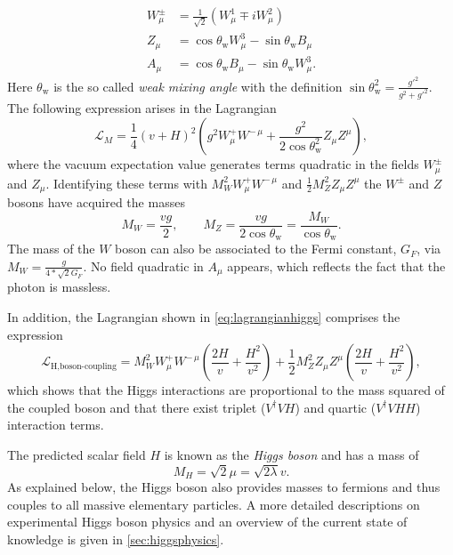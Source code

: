 \begin{align}
  W_\mu^\pm &= \frac{1}{\sqrt{2}} \left( W_\mu^1 \mp iW_\mu^2 \right) \\
  Z_\mu &= \cos\theta_\text{w} W_\mu^3 - \sin\theta_\text{w} B_\mu \\
  A_\mu &= \cos\theta_\text{w} B_\mu - \sin\theta_\text{w} W_\mu^3.
\end{align}
Here $\theta_\text{w}$ is the so called \emph{weak mixing angle} with the definition $\sin\theta_\text{w}^2 = \frac{g'^2}{g^2+g'^2}$.
The following expression arises in the Lagrangian %
\begin{equation}
  \mathcal{L}_M = \frac{1}{4} \left( v + H \right)^2  \left(g^2 W_\mu^+W^{-\,\mu} + \frac{g^2}{2\cos\theta_\text{w}^2} Z_\mu Z^\mu \right),
  \label{eq:lagrangianmasses}
\end{equation}
where the vacuum expectation value generates terms quadratic in the fields $W_\mu^\pm$ and $Z_\mu$. Identifying these terms with $M_W^2 W_\mu^+W^{-\,\mu}$ and $\frac{1}{2} M_Z^2 Z_\mu Z^\mu$ the $W^\pm$ and $Z$ bosons have acquired the masses
\begin{equation}
  M_W = \frac{v g}{2}, \qquad  
  M_Z = \frac{v g}{2\cos\theta_\text{w}} = \frac{M_W}{\cos\theta_\text{w}}.
\end{equation}
The mass of the $W$ boson can also be associated to the Fermi constant, $G_F$, via $M_W = \frac{g}{4 * \sqrt{2}G_F}$. 
No field quadratic in $A_\mu$ appears, which reflects the fact that the photon is massless.

In addition, the Lagrangian shown in \cref{eq:lagrangianhiggs} comprises the expression
\begin{equation}
  \mathcal{L}_{\text{H,boson-coupling}} = M_W^2 W_\mu^+W^{-\,\mu} \left( \frac{2H}{v} + \frac{H^2}{v^2} \right) + \frac{1}{2} M_Z^2 Z_\mu Z^\mu \left( \frac{2H}{v} + \frac{H^2}{v^2} \right),
  \label{eq:higgsbosoncoupling}
\end{equation}
which shows that the Higgs interactions are proportional to the mass squared of the coupled boson and that there exist triplet ($V^\dagger VH$) and quartic ($V^\dagger VHH$) interaction terms.



The predicted scalar field $H$ is known as the \emph{Higgs boson} and has a mass of 
\begin{equation}
  M_H = \sqrt{2} \mu = \sqrt{2 \lambda} v.
\end{equation}
As explained below, the Higgs boson also provides masses to fermions and thus couples to all massive elementary particles.
A more detailed descriptions on experimental Higgs boson physics and an overview of the current state of knowledge is given in \cref{sec:higgsphysics}.

